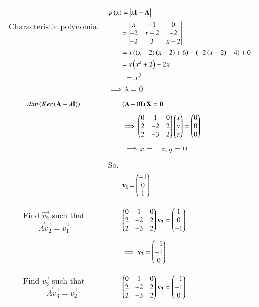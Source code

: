 \begin{longtable}{|c|l|}
    \hline
	\multirow{3}{*}{Characteristic polynomial} 
	& \\
	& $p\brak{x}=\mydet{x\Vec{I}-\Vec{A}}$\\
	& $\qquad = \begin{vmatrix}x&-1&0\\-2&x+2&-2\\-2&3&x-2\end{vmatrix}$\\
	& $\qquad=x\left(\left(x+2\right)\left(x-2\right)+6\right)+\left(-2\left(x-2\right)+4\right)+0$\\
	&$\qquad=x\left(x^2+2\right)-2x$\\
	&$\qquad=x^3$\\
	&\\
	&$\implies \lambda=0$\\
	&\\
	\hline
	\multirow{3}{*}{$dim\brak{Ker\brak{\vec{A}-\lambda\Vec{I}}}$} & \\
	&$\qquad\left(\mathbf{A}-0\mathbf{I}\right)\mathbf{X}=\mathbf{0}$\\
	&\\
	& $\qquad\implies \begin{pmatrix}0&1&0\\2&-2&2\\2&-3&2\end{pmatrix}\begin{pmatrix}x\\y\\z\end{pmatrix}=\begin{pmatrix}0\\0\\0\end{pmatrix}$\\
	&\\
	& $\qquad\implies x=-z, y=0$\\
	&\\
	& So,\\
	&$\qquad\mathbf{v_1}=\begin{pmatrix}-1\\0\\1\end{pmatrix}$\\
	&\\
	\hline
	\multirow{3}{*}{Find $\vec{v_2}$ such that $\vec{A}\vec{v_2}=\vec{v_1}$}&\\ &$\qquad\begin{pmatrix}0&1&0\\2&-2&2\\2&-3&2\end{pmatrix}\mathbf{v_2}=\begin{pmatrix}1\\0\\-1\end{pmatrix}$\\
	&\\
	& $\qquad\implies \mathbf{v_2}=\begin{pmatrix}-1\\-1\\0\end{pmatrix}$\\
	&\\
	\hline
	\multirow{3}{*}{Find $\vec{v_3}$ such that $\qquad\vec{A}\vec{v_3}=\vec{v_2}$}&\\ &$\qquad\begin{pmatrix}0&1&0\\2&-2&2\\2&-3&2\end{pmatrix}\mathbf{v_3}=\begin{pmatrix}-1\\-1\\0\end{pmatrix}$\\

\end{longtable}
